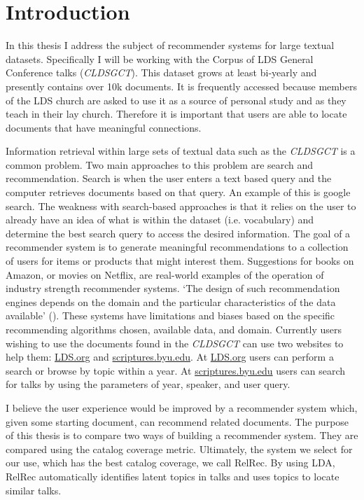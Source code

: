\chapter{Introduction}

In this thesis I address the subject of recommender systems for large textual datasets. Specifically I will be working with the Corpus of LDS General Conference talks (\textit{CLDSGCT}). This dataset grows at least bi-yearly and presently contains over 10k documents. It is frequently accessed because members of the LDS church are asked to use it as a source of personal study and as they teach in their lay church. Therefore it is important that users are able to locate documents that have meaningful connections.

Information retrieval within large sets of textual data such as the \textit{CLDSGCT} is a common problem. Two main approaches to this problem are search and recommendation. Search is when the user enters a text based query and the computer retrieves documents based on that query. An example of this is google search. The weakness with search-based approaches is that it relies on the user to already have an idea of what is within the dataset (i.e. vocabulary) and determine the best search query to access the desired information. The goal of a recommender system is to generate meaningful recommendations to a collection of users for items or products that might interest them. Suggestions for books on Amazon, or movies on Netflix, are real-world examples of the operation of industry strength recommender systems. `The design of such recommendation engines depends on the domain and the particular characteristics of the data available' (\citep{Melville2010}). These systems have limitations and biases based on the specific recommending algorithms chosen, available data, and domain. Currently users wishing to use the documents found in the \textit{CLDSGCT} can use two websites to help them: \url{LDS.org} and \url{scriptures.byu.edu}. At \url{LDS.org} users can perform a search or browse by topic within a year. At \url{scriptures.byu.edu} users can search for talks by using the parameters of year, speaker, and user query.

I believe the user experience would be improved by a recommender system which, given some starting document, can recommend related documents. The purpose of this thesis is to compare two ways of building a recommender system. They are compared using the catalog coverage metric. Ultimately, the system we select for our use, which has the best catalog coverage, we call RelRec. By using LDA, RelRec automatically identifies latent topics in talks and uses topics to locate similar talks.
